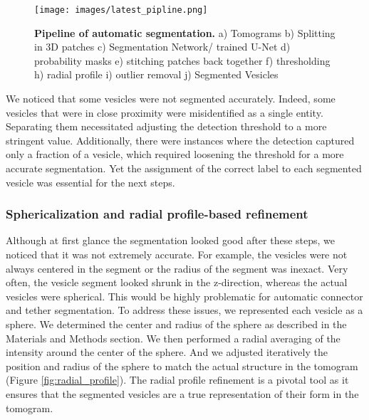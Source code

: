 \begin{figure}
\hypertarget{fig:pipeline}{%
\centering
\texttt{[image: images/latest\_pipline.png]}
\caption{\textbf{Pipeline of automatic segmentation.} a) Tomograms b) Splitting in 3D patches c) Segmentation Network/ trained U-Net d) probability masks e) stitching patches back together f) thresholding h) radial profile i) outlier removal j) Segmented Vesicles}\label{fig:pipeline}
}
\end{figure}

We noticed that some vesicles were not segmented accurately.
Indeed, some vesicles that were in close proximity were misidentified as a single entity.
Separating them necessitated adjusting the detection threshold to a more stringent value.
Additionally, there were instances where the detection captured only a fraction of a vesicle, which required loosening the threshold for a more accurate segmentation.
Yet the assignment of the correct label to each segmented vesicle was essential for the next steps.

\hypertarget{sphericalization-and-radial-profile-based-refinement}{%
\subsubsection{Sphericalization and radial profile-based refinement}\label{sphericalization-and-radial-profile-based-refinement}}

Although at first glance the segmentation looked good after these steps, we noticed that it was not extremely accurate.
For example, the vesicles were not always centered in the segment or the radius of the segment was inexact.
Very often, the vesicle segment looked shrunk in the z-direction, whereas the actual vesicles were spherical.
This would be highly problematic for automatic connector and tether segmentation.
To address these issues, we represented each vesicle as a sphere.
We determined the center and radius of the sphere as described in the Materials and Methods section.
We then performed a radial averaging of the intensity around the center of the sphere.
And we adjusted iteratively the position and radius of the sphere to match the actual structure in the tomogram (Figure \ref{fig:radial_profile}). The radial profile refinement is a pivotal tool as it ensures that the segmented vesicles are a true representation of their form in the tomogram.

